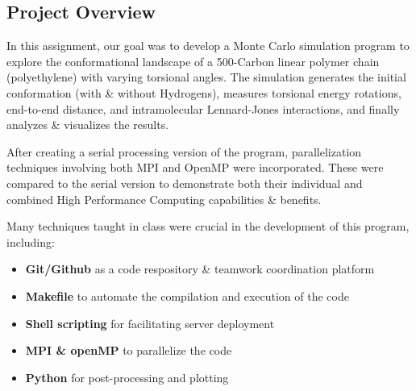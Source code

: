 \subsection{Project Overview}\label{project-overview}

In this assignment, our goal was to develop a Monte Carlo simulation
program to explore the conformational landscape of a 500-Carbon linear
polymer chain (polyethylene) with varying torsional angles. The
simulation generates the initial conformation (with \& without
Hydrogens), measures torsional energy rotations, end-to-end distance,
and intramolecular Lennard-Jones interactions, and finally analyzes \&
visualizes the results.

After creating a serial processing version of the program,
parallelization techniques involving both MPI and OpenMP were
incorporated. These were compared to the serial version to demonstrate
both their individual and combined High Performance Computing
capabilities \& benefits.

Many techniques taught in class were crucial in the development of this
program, including: 
\begin{itemize}
    \item \textbf{Git/Github} as a code respository \& teamwork coordination platform
    \item \textbf{Makefile} to automate the compilation and execution of the code
    \item \textbf{Shell scripting} for facilitating server deployment
    \item \textbf{MPI \& openMP} to parallelize the code
    \item \textbf{Python} for post-processing and plotting
\end{itemize}